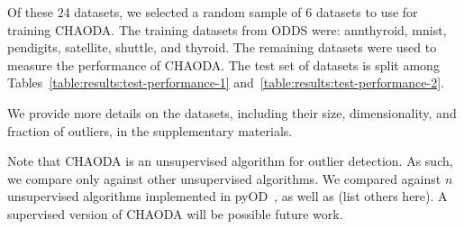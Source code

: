 Of these 24 datasets, we selected a random sample of 6 datasets to use for training CHAODA\@.
The training datasets from ODDS were: annthyroid, mnist, pendigits, satellite, shuttle, and thyroid.
The remaining datasets were used to measure the performance of CHAODA\@.
The test set of datasets is split among Tables~\ref{table:results:test-performance-1} and~\ref{table:results:test-performance-2}.

We provide more details on the datasets, including their size, dimensionality, and fraction of outliers, in the supplementary materials.

Note that CHAODA is an unsupervised algorithm for outlier detection.
As such, we compare only against other unsupervised algorithms.
We compared against $n$ unsupervised algorithms implemented in pyOD~\cite{zhao2019pyod}, as well as (list others here). %
A supervised version of CHAODA will be possible future work.

